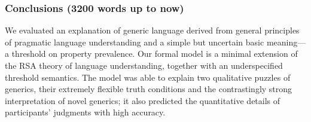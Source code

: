 \documentclass[10pt,letterpaper]{article}
\begin{document}
\subsubsection*{Conclusions (3200 words up to now)}


We evaluated an explanation of generic language derived from general principles of pragmatic language understanding and a simple but uncertain basic meaning---a threshold on property prevalence.
Our formal model is a minimal extension of the RSA theory of language understanding, together with an underspecified threshold semantics.
The model was able to explain two qualitative puzzles of generics, their extremely flexible truth conditions and the contrastingly strong interpretation of novel generics; it also predicted the quantitative details of participants' judgments with high accuracy.




\end{document}
